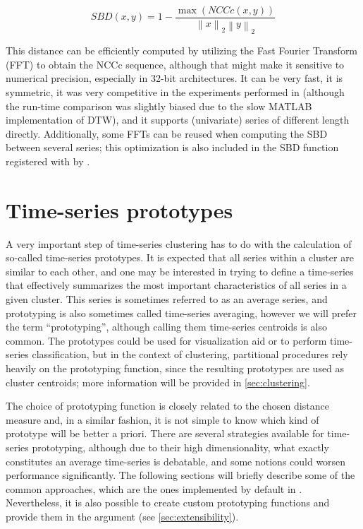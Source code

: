 \begin{equation}
\label{eq:sbd}
SBD(x,y) = 1 - \frac{\max \left( NCCc(x,y) \right)}{\left\lVert x \right\rVert_2 \left\lVert y \right\rVert_2}
\end{equation}

This distance can be efficiently computed by utilizing the Fast Fourier Transform (FFT) to obtain the NCCc sequence,
although that might make it sensitive to numerical precision,
especially in 32-bit architectures.
It can be very fast,
it is symmetric,
it was very competitive in the experiments performed in \citet{paparrizos2015}
(although the run-time comparison was slightly biased due to the slow MATLAB implementation of DTW),
and it supports (univariate) series of different length directly.
Additionally, some FFTs can be reused when computing the SBD between several series;
this optimization is also included in the SBD function registered with  by \dtwclust{}.

\section{Time-series prototypes}
\label{sec:prototypes}

A very important step of time-series clustering has to do with the calculation of so-called time-series prototypes.
It is expected that all series within a cluster are similar to each other,
and one may be interested in trying to define a time-series that effectively summarizes the most important characteristics of all series in a given cluster.
This series is sometimes referred to as an average series,
and prototyping is also sometimes called time-series averaging,
however we will prefer the term ``prototyping'',
although calling them time-series centroids is also common.
The prototypes could be used for visualization aid or to perform time-series classification,
but in the context of clustering,
partitional procedures rely heavily on the prototyping function,
since the resulting prototypes are used as cluster centroids;
more information will be provided in \cref{sec:clustering}.

The choice of prototyping function is closely related to the chosen distance measure and,
in a similar fashion,
it is not simple to know which kind of prototype will be better a priori.
There are several strategies available for time-series prototyping,
although due to their high dimensionality,
what exactly constitutes an average time-series is debatable,
and some notions could worsen performance significantly.
The following sections will briefly describe some of the common approaches,
which are the ones implemented by default in \dtwclust{}.
Nevertheless, it is also possible to create custom prototyping functions and provide them in the  argument
(see \cref{sec:extensibility}).

